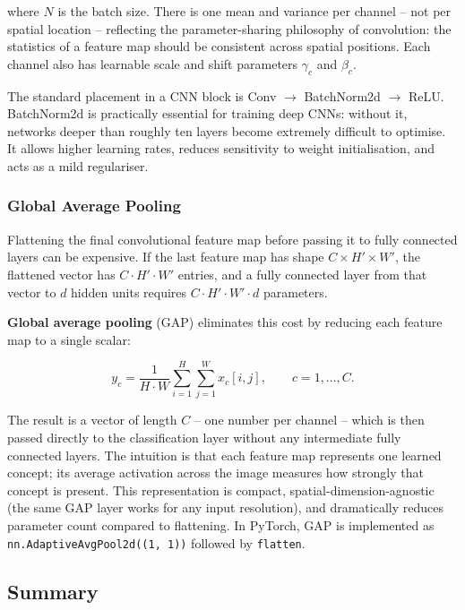 where $N$ is the batch size. There is one mean and variance per channel -- not per spatial location -- reflecting the parameter-sharing philosophy of convolution: the statistics of a feature map should be consistent across spatial positions. Each channel also has learnable scale and shift parameters $\gamma_c$ and $\beta_c$.

The standard placement in a CNN block is Conv $\to$ BatchNorm2d $\to$ ReLU. BatchNorm2d is practically essential for training deep CNNs: without it, networks deeper than roughly ten layers become extremely difficult to optimise. It allows higher learning rates, reduces sensitivity to weight initialisation, and acts as a mild regulariser.

\subsubsection{Global Average Pooling}

Flattening the final convolutional feature map before passing it to fully connected layers can be expensive. If the last feature map has shape $C \times H' \times W'$, the flattened vector has $C \cdot H' \cdot W'$ entries, and a fully connected layer from that vector to $d$ hidden units requires $C \cdot H' \cdot W' \cdot d$ parameters.

\textbf{Global average pooling} (GAP) eliminates this cost by reducing each feature map to a single scalar:

\begin{equation}
    y_c = \frac{1}{H \cdot W} \sum_{i=1}^{H}\sum_{j=1}^{W} x_c[i,j], \qquad c = 1,\ldots,C.
    \label{eq:gap}
\end{equation}

The result is a vector of length $C$ -- one number per channel -- which is then passed directly to the classification layer without any intermediate fully connected layers. The intuition is that each feature map represents one learned concept; its average activation across the image measures how strongly that concept is present. This representation is compact, spatial-dimension-agnostic (the same GAP layer works for any input resolution), and dramatically reduces parameter count compared to flattening. In PyTorch, GAP is implemented as \verb|nn.AdaptiveAvgPool2d((1, 1))| followed by \verb|flatten|.

\subsection{Summary}
\label{sec:cnns:summary}

